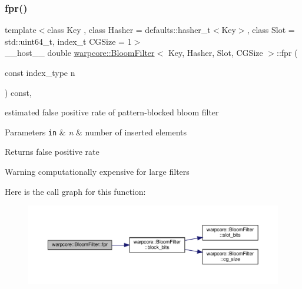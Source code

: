 \subsubsection{\texorpdfstring{fpr()}{fpr()}}
{\footnotesize\ttfamily template$<$class Key , class Hasher  = defaults\+::hasher\+\_\+t$<$\+Key$>$, class Slot  = std\+::uint64\+\_\+t, index\+\_\+t C\+G\+Size = 1$>$ \\
\+\_\+\+\_\+host\+\_\+\+\_\+ double \hyperlink{classwarpcore_1_1BloomFilter}{warpcore\+::\+Bloom\+Filter}$<$ Key, Hasher, Slot, C\+G\+Size $>$\+::fpr (\begin{DoxyParamCaption}\item[{const index\+\_\+type}]{n }\end{DoxyParamCaption}) const\hspace{0.3cm}{\ttfamily [inline]}, {\ttfamily [noexcept]}}



estimated false positive rate of pattern-\/blocked bloom filter 


\begin{DoxyParams}[1]{Parameters}
\mbox{\tt in}  & {\em n} & number of inserted elements \\
\hline
\end{DoxyParams}
\begin{DoxyReturn}{Returns}
false positive rate 
\end{DoxyReturn}
\begin{DoxyWarning}{Warning}
computationally expensive for large filters 
\end{DoxyWarning}
Here is the call graph for this function\+:
\nopagebreak
\begin{figure}[H]
\begin{center}
\leavevmode
\includegraphics[width=350pt]{classwarpcore_1_1BloomFilter_a27b98847aa06d277c48068ff59ca9381_cgraph}
\end{center}
\end{figure}
\mbox{\label{classwarpcore_1_1BloomFilter_a5f713802c324b840918111857976755e}} 
